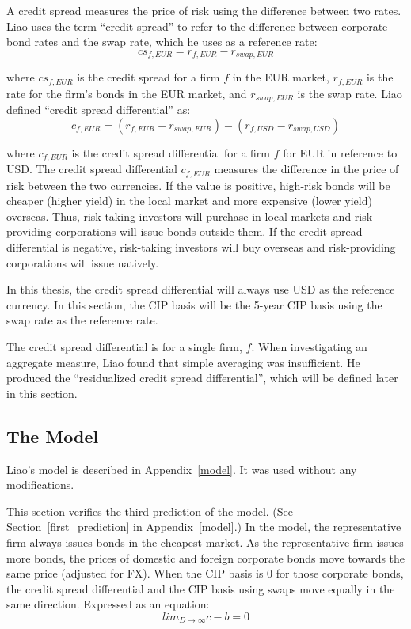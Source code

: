 A credit spread measures the price of risk using the difference between two rates.  Liao uses the term ``credit spread'' to refer to the difference between corporate bond rates and the swap rate, which he uses as a reference rate:
\begin{equation}
  \label{credit_spread_eqn}
cs_{f,EUR} = r_{f,EUR} - r_{swap,EUR}
\end{equation}

\noindent where $cs_{f,EUR}$ is the credit spread for a firm $f$ in the EUR market,  $r_{f,EUR}$ is the rate for the firm's bonds in the EUR market, and $r_{swap,EUR}$ is the swap rate.  Liao defined ``credit spread differential'' as:
\begin{equation}
  \label{credit_spread_diff_eqn}
c_{f,EUR} = (r_{f,EUR} - r_{swap,EUR}) - (r_{f,USD} - r_{swap,USD}) 
\end{equation}

\noindent where $c_{f,EUR}$ is the credit spread differential for a firm $f$ for EUR in reference to USD.  The credit spread differential $c_{f,EUR}$ measures the difference in the price of risk between the two currencies.  If the value is positive, high-risk bonds will be cheaper (higher yield) in the local market and more expensive (lower yield) overseas.   Thus, risk-taking investors will purchase in local markets and risk-providing corporations will issue bonds outside them.  If the credit spread differential is negative, risk-taking investors will buy overseas and risk-providing corporations will issue natively.

In this thesis, the credit spread differential will always use USD as the reference currency.  In this section, the CIP basis will be the 5-year CIP basis using the swap rate as the reference rate. 

The credit spread differential is for a single firm, $f$.  When investigating an aggregate measure, Liao found that simple averaging was insufficient.  He produced the ``residualized credit spread differential'', which will be defined later in this section.


\subsection{The Model}

Liao's model is described in Appendix~\ref{model}.  It was used without any modifications.

This section verifies the third prediction of the model.  (See Section~\ref{first_prediction} in Appendix~\ref{model}.)  In the model, the representative firm always issues bonds in the cheapest market.  As the representative firm issues more bonds, the prices of domestic and foreign corporate bonds move towards the same price (adjusted for FX).  When the CIP basis is 0 for those corporate bonds, the credit spread differential and the CIP basis using swaps move equally in the same direction.  Expressed as an equation:
\begin{equation}
  \label{third_prediction}
  lim_{D \to \infty} c-b = 0
\end{equation}

